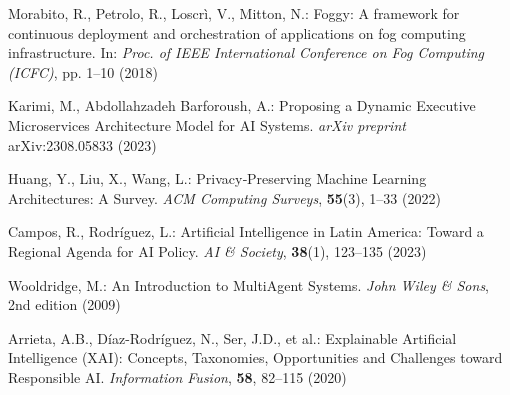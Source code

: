 \documentclass[a4paper]{llncs}
\begin{document}
\begin{thebibliography}{9}
Morabito, R., Petrolo, R., Loscrì, V., Mitton, N.:
Foggy: A framework for continuous deployment and orchestration of applications on fog computing infrastructure.
In: \textit{Proc. of IEEE International Conference on Fog Computing (ICFC)}, pp. 1--10 (2018)

Karimi, M., Abdollahzadeh Barforoush, A.:
Proposing a Dynamic Executive Microservices Architecture Model for AI Systems.
\textit{arXiv preprint} arXiv:2308.05833 (2023)

Huang, Y., Liu, X., Wang, L.:
Privacy‑Preserving Machine Learning Architectures: A Survey.
\textit{ACM Computing Surveys}, \textbf{55}(3), 1–33 (2022)

Campos, R., Rodríguez, L.:
Artificial Intelligence in Latin America: Toward a Regional Agenda for AI Policy.
\textit{AI \& Society}, \textbf{38}(1), 123--135 (2023)

Wooldridge, M.:
An Introduction to MultiAgent Systems.
\textit{John Wiley \& Sons}, 2nd edition (2009)

Arrieta, A.B., Díaz-Rodríguez, N., Ser, J.D., et al.:
Explainable Artificial Intelligence (XAI): Concepts, Taxonomies, Opportunities and Challenges toward Responsible AI.
\textit{Information Fusion}, \textbf{58}, 82--115 (2020)

\end{thebibliography}
\end{document}
